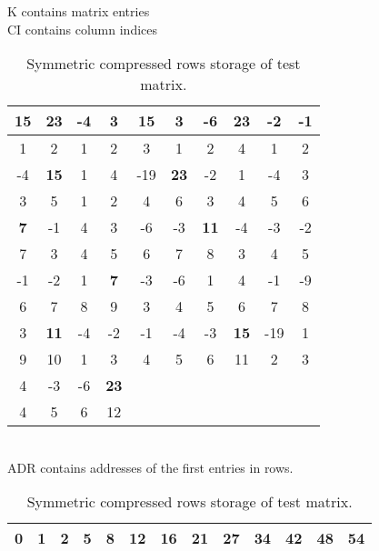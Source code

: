 \begin{table}[tbh]
\begin{center}
K contains matrix entries
\\
CI contains column indices
\\[3mm]
\begin{tabular}{|c|c|c|c|c|c|c|c|c|c|}
\hline
{\bf 15} & {\bf 23} &  -4 &   3 & {\bf 15} &   3 &  -6 & {\bf 23} &  -2 &  -1 
\\ \hline
1 & 2 & 1 & 2 & 3 & 1 & 2 & 4 & 1 & 2
\\ \hline \hline
  -4 & {\bf 15} &   1 &   4 & -19 & {\bf 23} &  -2 &   1 &  -4 &   3 
\\ \hline
3 & 5 & 1 & 2 & 4 & 6 & 3 & 4 & 5 & 6
\\ \hline \hline
{\bf 7} &  -1 &   4 &   3 &  -6 &  -3 & {\bf 11} &  -4 &  -3 &  -2 
\\ \hline
7 & 3 & 4 & 5 & 6 & 7 & 8 & 3 & 4 & 5
\\ \hline \hline
  -1 &  -2 &   1 &  {\bf 7} &  -3 &  -6 &   1 &   4 &  -1 &  -9 
\\ \hline
6 & 7 & 8 & 9 & 3 & 4 & 5 & 6 & 7 & 8
\\ \hline \hline
   3 & {\bf 11} &  -4 &  -2 &  -1 &  -4 &  -3 & {\bf 15} & -19 &   1 
\\ \hline
9 & 10 & 1 & 3 & 4 & 5 & 6 & 11 & 2 & 3
\\ \hline \cline{1-4}
   4 &  -3 &  -6 & {\bf 23} & \multicolumn{6}{c}{}
\\ \cline{1-4}
4 & 5 & 6 & 12 & \multicolumn{6}{c}{}
\\ \cline{1-4}
\end{tabular}
\\[5mm]
ADR contains addresses of the first entries in rows.
\\[3mm]
\begin{tabular}{|c|c|c|c|c|c|c|c|c|c|c|c|c|}
\hline
0 & 1 & 2 & 5 & 8 & 12 & 16 & 21 & 27 & 34 & 42 & 48 & 54
\\ \hline
\end{tabular}
\caption{Symmetric compressed rows storage of test matrix.}
\label{tabscrmat}
\end{center}
\end{table}
